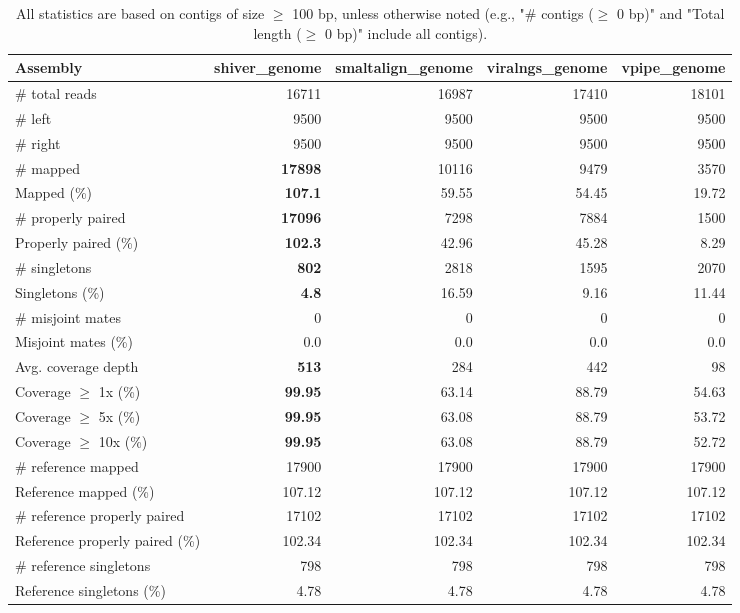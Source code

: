 \documentclass[12pt,a4paper]{article}
\begin{document}
\begin{table}[ht]
\begin{center}
\caption{All statistics are based on contigs of size $\geq$ 100 bp, unless otherwise noted (e.g., "\# contigs ($\geq$ 0 bp)" and "Total length ($\geq$ 0 bp)" include all contigs).}
\begin{tabular}{|l*{4}{|r}|}
\hline
Assembly & shiver\_genome & smaltalign\_genome & viralngs\_genome & vpipe\_genome \\ \hline
\# total reads & 16711 & 16987 & 17410 & 18101 \\ \hline
\# left & 9500 & 9500 & 9500 & 9500 \\ \hline
\# right & 9500 & 9500 & 9500 & 9500 \\ \hline
\# mapped & {\bf 17898} & 10116 & 9479 & 3570 \\ \hline
Mapped (\%) & {\bf 107.1} & 59.55 & 54.45 & 19.72 \\ \hline
\# properly paired & {\bf 17096} & 7298 & 7884 & 1500 \\ \hline
Properly paired (\%) & {\bf 102.3} & 42.96 & 45.28 & 8.29 \\ \hline
\# singletons & {\bf 802} & 2818 & 1595 & 2070 \\ \hline
Singletons (\%) & {\bf 4.8} & 16.59 & 9.16 & 11.44 \\ \hline
\# misjoint mates & 0 & 0 & 0 & 0 \\ \hline
Misjoint mates (\%) & 0.0 & 0.0 & 0.0 & 0.0 \\ \hline
Avg. coverage depth & {\bf 513} & 284 & 442 & 98 \\ \hline
Coverage $\geq$ 1x (\%) & {\bf 99.95} & 63.14 & 88.79 & 54.63 \\ \hline
Coverage $\geq$ 5x (\%) & {\bf 99.95} & 63.08 & 88.79 & 53.72 \\ \hline
Coverage $\geq$ 10x (\%) & {\bf 99.95} & 63.08 & 88.79 & 52.72 \\ \hline
\# reference mapped & 17900 & 17900 & 17900 & 17900 \\ \hline
Reference mapped (\%) & 107.12 & 107.12 & 107.12 & 107.12 \\ \hline
\# reference properly paired & 17102 & 17102 & 17102 & 17102 \\ \hline
Reference properly paired (\%) & 102.34 & 102.34 & 102.34 & 102.34 \\ \hline
\# reference singletons & 798 & 798 & 798 & 798 \\ \hline
Reference singletons (\%) & 4.78 & 4.78 & 4.78 & 4.78 \\ \hline

\end{tabular}
\end{center}
\end{table}
\end{document}
